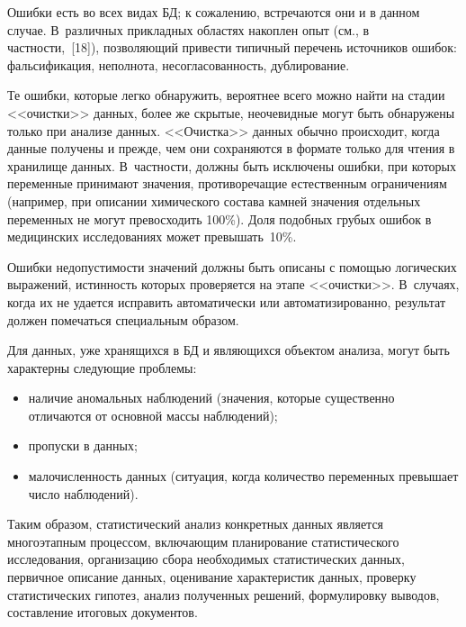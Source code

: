 \begin{multicols}{2}
      Ошибки есть во всех видах БД; к сожалению, встречаются они и в данном 
случае. В~различных прикладных областях накоплен опыт (см., в частности,~[18]), 
позволяющий привести типичный перечень источников ошибок: фальсификация, неполнота, 
несогласованность, дублирование. 
      
      Те ошибки, которые легко обнаружить, вероятнее всего можно найти на стадии 
<<очистки>> данных, более же скрытые, неочевидные могут быть обнаружены только при 
анализе данных. <<Очистка>> данных обычно происходит, когда данные получены и прежде, 
чем они сохраняются в формате только для чтения в хранилище данных. В~частности, должны 
быть исключены ошибки, при которых переменные принимают значения, противоречащие 
естественным ограничениям (например, при описании химического состава камней значения 
отдельных переменных не могут превосходить 100\%). Доля подобных грубых ошибок в 
медицинских исследованиях может превышать~10\%. 
      
      Ошибки недопустимости значений должны быть описаны с помощью логических 
выражений, истинность которых проверяется на этапе <<очистки>>. В~случаях, когда их не 
удается исправить автоматически или автоматизированно, результат должен помечаться 
специальным образом. 
      
      Для данных, уже хранящихся в БД и явля\-ющих\-ся объектом анализа, могут 
быть характерны сле\-ду\-ющие проблемы: 
\begin{itemize}
\item наличие аномальных наблюдений (значения, которые 
существенно отличаются от основной массы наблюдений);
\item пропуски в данных;
\item малочисленность данных (ситуация, когда количество переменных превышает число 
наблюдений).
\end{itemize}
      
      Таким образом, статистический анализ конкретных данных является многоэтапным 
процессом, включающим планирование статистического исследования, организацию сбора 
необходимых статистических данных, первичное описание данных, оценивание характеристик 
данных, проверку статистических гипотез, анализ полученных решений, формулировку 
выводов, составление итоговых документов. 
      

\end{multicols}
